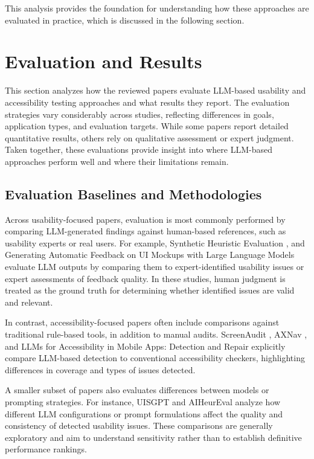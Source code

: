 \documentclass[acmsmall,nonacm]{acmart}
\begin{document}
This analysis provides the foundation for understanding how these approaches are evaluated in practice, which is discussed in the following section.

\section{Evaluation and Results}

This section analyzes how the reviewed papers evaluate LLM-based usability and accessibility testing approaches and what results they report. The evaluation strategies vary considerably across studies, reflecting differences in goals, application types, and evaluation targets. While some papers report detailed quantitative results, others rely on qualitative assessment or expert judgment. Taken together, these evaluations provide insight into where LLM-based approaches perform well and where their limitations remain.

\subsection{Evaluation Baselines and Methodologies}

Across usability-focused papers, evaluation is most commonly performed by comparing LLM-generated findings against human-based references, such as usability experts or real users. For example, Synthetic Heuristic Evaluation \cite{zhong2023synthetic_heuristic}, and Generating Automatic Feedback on UI Mockups with Large Language Models \cite{duan2024ui_mockup_feedback} evaluate LLM outputs by comparing them to expert-identified usability issues or expert assessments of feedback quality. In these studies, human judgment is treated as the ground truth for determining whether identified issues are valid and relevant.

In contrast, accessibility-focused papers often include comparisons against traditional rule-based tools, in addition to manual audits. ScreenAudit \cite{zhong2024screenaudit}, AXNav \cite{taeb2023axnav}, and LLMs for Accessibility in Mobile Apps: Detection and Repair \cite{aljedaani2024llm_accessibility} explicitly compare LLM-based detection to conventional accessibility checkers, highlighting differences in coverage and types of issues detected.

A smaller subset of papers also evaluates differences between models or prompting strategies. For instance, UISGPT \cite{yang2023uisgpt} and AIHeurEval \cite{wang2024aiheureval} analyze how different LLM configurations or prompt formulations affect the quality and consistency of detected usability issues. These comparisons are generally exploratory and aim to understand sensitivity rather than to establish definitive performance rankings.
\end{document}

